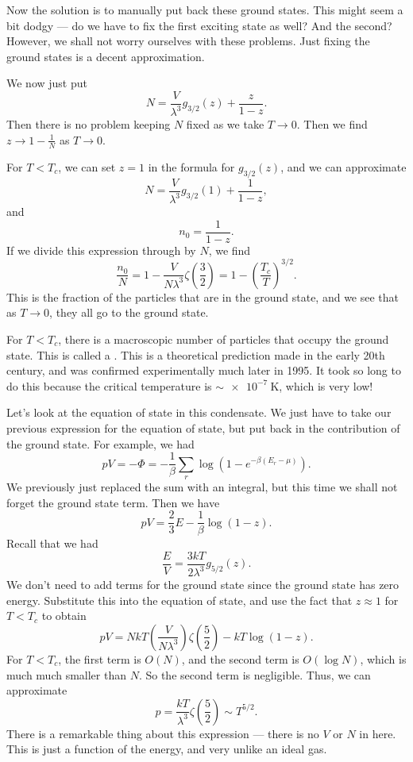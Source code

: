 \documentclass[a4paper]{article}
\begin{document}
Now the solution is to manually put back these ground states. This might seem a bit dodgy --- do we have to fix the first exciting state as well? And the second? However, we shall not worry ourselves with these problems. Just fixing the ground states is a decent approximation.

We now just put
\[
  N = \frac{V}{\lambda^3} g_{3/2}(z) + \frac{z}{1 - z}.
\]
Then there is no problem keeping $N$ fixed as we take $T \to 0$. Then we find $z \to 1 - \frac{1}{N}$ as $T \to 0$.

For $T < T_c$, we can set $z = 1$ in the formula for $g_{3/2}(z)$, and we can approximate
\[
  N = \frac{V}{\lambda^3} g_{3/2}(1) + \frac{1}{1 - z},
\]
and
\[
  n_0 = \frac{1}{1 - z}.
\]
If we divide this expression through by $N$, we find
\[
  \frac{n_0}{N} = 1 - \frac{V}{N \lambda^3} \zeta\left(\frac{3}{2}\right) = 1 - \left(\frac{T_c}{T}\right)^{3/2}.
\]
This is the fraction of the particles that are in the ground state, and we see that as $T \to 0$, they all go to the ground state.

For $T < T_c$, there is a macroscopic number of particles that occupy the ground state. This is called a . This is a theoretical prediction made in the early 20th century, and was confirmed experimentally much later in 1995. It took so long to do this because the critical temperature is $\sim \SI{e-7}{\kelvin}$, which is very low!

Let's look at the equation of state in this condensate. We just have to take our previous expression for the equation of state, but put back in the contribution of the ground state. For example, we had
\[
  pV = - \Phi = -\frac{1}{\beta} \sum_r \log(1 - e^{-\beta(E_r - \mu)}).
\]
We previously just replaced the sum with an integral, but this time we shall not forget the ground state term. Then we have
\[
  pV = \frac{2}{3}E - \frac{1}{\beta} \log(1 - z).
\]
Recall that we had
\[
  \frac{E}{V} = \frac{3kT}{2 \lambda^3} g_{5/2}(z).\tag{$\ddagger$}
\]
We don't need to add terms for the ground state since the ground state has zero energy. Substitute this into the equation of state, and use the fact that $z \approx 1$ for $T < T_c$ to obtain
\[
  pV = Nk T \left(\frac{V}{N\lambda^3}\right) \zeta\left(\frac{5}{2}\right) - kT \log(1 - z).
\]
For $T < T_c$, the first term is $O(N)$, and the second term is $O(\log N)$, which is much much smaller than $N$. So the second term is negligible. Thus, we can approximate
\[
  p = \frac{kT}{\lambda^3} \zeta\left(\frac{5}{2}\right) \sim T^{5/2}.
\]
There is a remarkable thing about this expression --- there is no $V$ or $N$ in here. This is just a function of the energy, and very unlike an ideal gas.
\end{document}
